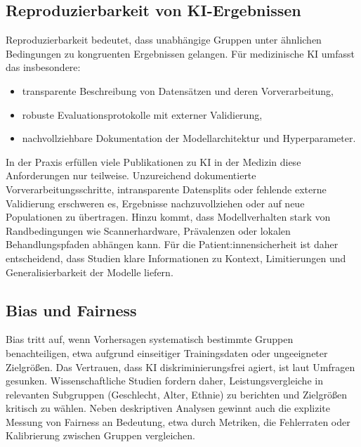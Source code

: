 \documentclass[lettersize,journal]{IEEEtran}
\begin{document}
\subsection{Reproduzierbarkeit von KI-Ergebnissen}
\label{subsec:reproduzierbarkeit}

Reproduzierbarkeit bedeutet, dass unabhängige Gruppen unter ähnlichen Bedingungen zu kongruenten Ergebnissen gelangen. Für medizinische KI umfasst das insbesondere:
\begin{itemize}
	\item transparente Beschreibung von Datensätzen und deren Vorverarbeitung,
	\item robuste Evaluationsprotokolle mit externer Validierung,
	\item nachvollziehbare Dokumentation der Modellarchitektur und Hyperparameter\cite{ref:hai2025aiindex}.
\end{itemize}

In der Praxis erfüllen viele Publikationen zu KI in der Medizin diese Anforderungen nur teilweise\cite{ref:hai2025aiindex}. Unzureichend dokumentierte Vorverarbeitungsschritte, intransparente Datensplits oder fehlende externe Validierung erschweren es, Ergebnisse nachzuvollziehen oder auf neue Populationen zu übertragen. Hinzu kommt, dass Modellverhalten stark von Randbedingungen wie Scannerhardware, Prävalenzen oder lokalen Behandlungspfaden abhängen kann. Für die Patient:innensicherheit ist daher entscheidend, dass Studien klare Informationen zu Kontext, Limitierungen und Generalisierbarkeit der Modelle liefern.



\subsection{Bias und Fairness}



\label{subsec:bias_fairness}


Bias tritt auf, wenn Vorhersagen systematisch bestimmte Gruppen benachteiligen, etwa aufgrund einseitiger Trainingsdaten oder ungeeigneter Zielgrößen\cite{ref:hai2025aiindex}\cite{ref:celi2022bias}. Das Vertrauen, dass KI diskriminierungsfrei agiert, ist laut Umfragen gesunken. Wissenschaftliche Studien fordern daher, Leistungsvergleiche in relevanten Subgruppen (Geschlecht, Alter, Ethnie) zu berichten und Zielgrößen kritisch zu wählen\cite{ref:celi2022bias}\cite{ref:hai2025aiindex}. Neben deskriptiven Analysen gewinnt auch die explizite Messung von Fairness an Bedeutung, etwa durch Metriken, die Fehlerraten oder Kalibrierung zwischen Gruppen vergleichen\cite{ref:celi2022bias}. 
\end{document}
